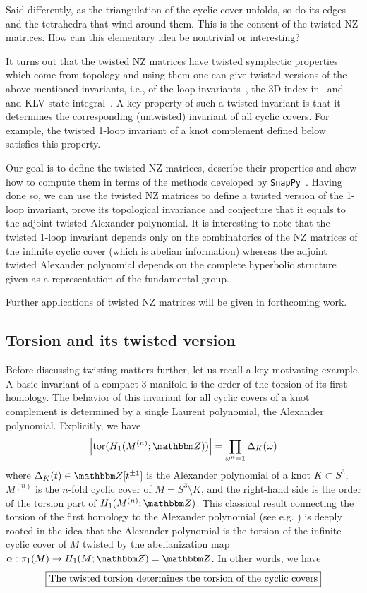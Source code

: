 \documentclass[12pt,reqno]{amsart}
\theoremstyle{definition}
\def\BZ{\mathbbm Z}
\def\be{\begin{equation}}
\def\ee{\end{equation}}
\begin{document}
Said differently, as the triangulation of the cyclic cover unfolds, so do its edges
and the tetrahedra that wind around them. This is the content of the twisted NZ
matrices. How can this elementary idea be nontrivial or interesting?

It turns out
that the twisted NZ matrices have twisted symplectic properties which come from topology
and %
using them one can give twisted versions of the above mentioned
invariants, i.e., of the loop invariants~\cite{DG1,DG2}, the 3D-index
in~\cite{DGG1,DGG2} and~\cite{GK:meromorphic} and KLV state-integral~\cite{KLV,AGK:KLV}.
A key property of such a twisted invariant is that it determines the corresponding
(untwisted) invariant of all cyclic covers. For example, the twisted 1-loop
invariant of a knot complement defined below satisfies this property.

Our goal is to define the twisted NZ matrices, describe their properties and show how
to compute them in terms of the methods developed by \texttt{SnapPy}~\cite{snappy}.
Having done so, we can use the twisted NZ matrices to define a twisted version of
the 1-loop invariant, prove its topological invariance and conjecture that it
equals to the adjoint twisted Alexander
polynomial. It is interesting to note that the twisted 1-loop invariant depends only
on the combinatorics of the NZ matrices of the infinite cyclic cover (which is
abelian information) whereas the adjoint twisted Alexander polynomial depends on the 
complete hyperbolic structure given as a representation of the fundamental group.

Further applications of twisted NZ matrices will be given in forthcoming work. 

\subsection{Torsion and its twisted version}
\label{sub.tt}

Before discussing twisting matters further, let us recall a key motivating example.
A basic invariant of a compact 3-manifold is the order of the torsion of its
first homology. The behavior of this invariant for all cyclic covers of a knot
complement is determined by a single Laurent polynomial, the Alexander polynomial.
Explicitly, we have
\be
\label{TDn}
\left|\mathrm{tor}(H_1(M^{(n)};\BZ))\right| = \prod_{\omega^n=1} \Delta_K(\omega) 
\ee
where $\Delta_K(t) \in \BZ[t^{\pm1}]$ is the  Alexander polynomial of a knot
$K \subset S^3$, $M^{(n)}$ is the $n$-fold cyclic cover of $M=S^3\setminus K$,
and the right-hand side
is the order of the torsion part of $H_1(M^{(n)};\BZ)$. This classical result
connecting the torsion of the first homology to the Alexander polynomial
(see e.g. \cite[(6.3), p.417]{Fox3}) is deeply rooted in the idea that the Alexander
polynomial is the torsion of the infinite cyclic cover of $M$ twisted by the
abelianization map $\alpha:\pi_1(M) \rightarrow H_1(M;\BZ)=\BZ$. In other words,
we have
\be
\boxed{
\label{basic}
\text{The twisted torsion determines the torsion of the cyclic covers} 
}
\ee
\end{document}
